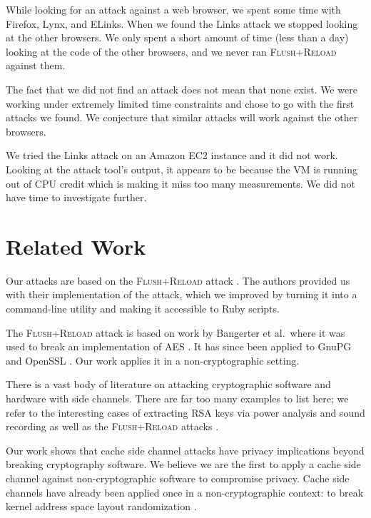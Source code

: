 \documentclass[letterpaper,twocolumn,10pt]{article}
\begin{document}
While looking for an attack against a web browser, we spent some time with
Firefox, Lynx, and ELinks. When we found the Links attack we stopped looking at
the other browsers. We only spent a short amount of time (less than a day)
looking at the code of the other browsers, and we never ran \textsc{Flush+Reload} against
them.

The fact that we did not find an attack does not mean that none exist. We were
working under extremely limited time constraints and chose to go with the first
attacks we found. We conjecture that similar attacks will work against the other
browsers.

We tried the Links attack on an Amazon EC2 instance and it did not work. Looking
at the attack tool's output, it appears to be because the VM is running out of
CPU credit which is making it miss too many measurements. We did not have time
to investigate further.

\section{Related Work}
\label{sec:relwork}

Our attacks are based on the \textsc{Flush+Reload} attack \cite{yarom2013flush}.
The authors provided us with their implementation of the attack, which we
improved by turning it into a command-line utility and making it accessible to
Ruby scripts.

The \textsc{Flush+Reload} attack is based on work by Bangerter et al.\ where it was used
to break an implementation of AES \cite{gullasch2011cache}. It has since been
applied to GnuPG \cite{yarom2013flush} and OpenSSL \cite{benger2014ooh,
yarom2014recovering}. Our work applies it in a non-cryptographic setting.

There is a vast body of literature on attacking cryptographic software and
hardware with side channels. There are far too many examples to list here; we
refer to the interesting cases of extracting RSA keys via power analysis
\cite{messerges1999power} and sound recording \cite{genkin2013rsa} as well as
the \textsc{Flush+Reload} attacks \cite{yarom2013flush, benger2014ooh,
yarom2014recovering}.

Our work shows that cache side channel attacks have privacy implications beyond
breaking cryptography software. We believe we are the first to apply a cache
side channel against non-cryptographic software to compromise privacy. Cache
side channels have already been applied once in a non-cryptographic context: to
break kernel address space layout randomization \cite{hund2013practical}.
\end{document}
